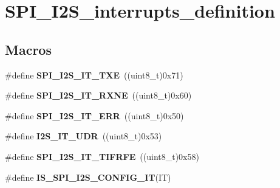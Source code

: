 \hypertarget{group___s_p_i___i2_s__interrupts__definition}{}\section{S\+P\+I\+\_\+\+I2\+S\+\_\+interrupts\+\_\+definition}
\label{group___s_p_i___i2_s__interrupts__definition}
\subsection*{Macros}
\begin{DoxyCompactItemize}
\item 
\mbox{\label{group___s_p_i___i2_s__interrupts__definition_ga0f192977fdb12c40d35672b8ae074724}} 
\#define {\bfseries S\+P\+I\+\_\+\+I2\+S\+\_\+\+I\+T\+\_\+\+T\+XE}~((uint8\+\_\+t)0x71)
\item 
\mbox{\label{group___s_p_i___i2_s__interrupts__definition_gae46dd53cd2e4ad8b8a7836d3dcec57ea}} 
\#define {\bfseries S\+P\+I\+\_\+\+I2\+S\+\_\+\+I\+T\+\_\+\+R\+X\+NE}~((uint8\+\_\+t)0x60)
\item 
\mbox{\label{group___s_p_i___i2_s__interrupts__definition_ga1d9d4916bf7ae315f23a54ecfbcd9157}} 
\#define {\bfseries S\+P\+I\+\_\+\+I2\+S\+\_\+\+I\+T\+\_\+\+E\+RR}~((uint8\+\_\+t)0x50)
\item 
\mbox{\label{group___s_p_i___i2_s__interrupts__definition_ga54aba7dc06f97fb4839de5f42bd5a47d}} 
\#define {\bfseries I2\+S\+\_\+\+I\+T\+\_\+\+U\+DR}~((uint8\+\_\+t)0x53)
\item 
\mbox{\label{group___s_p_i___i2_s__interrupts__definition_gab147fb8ba6913106e06ac80dcf4005a4}} 
\#define {\bfseries S\+P\+I\+\_\+\+I2\+S\+\_\+\+I\+T\+\_\+\+T\+I\+F\+R\+FE}~((uint8\+\_\+t)0x58)
\item 
\#define {\bfseries I\+S\+\_\+\+S\+P\+I\+\_\+\+I2\+S\+\_\+\+C\+O\+N\+F\+I\+G\+\_\+\+IT}(IT)
\item 
\mbox{\label{group___s_p_i___i2_s__interrupts__definition_ga279c30176e8ff7e2ec299774a2e88f45}} 

\end{DoxyCompactItemize}
